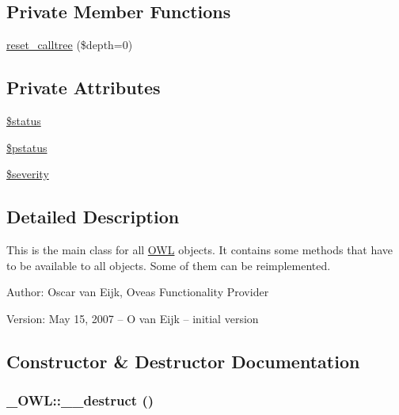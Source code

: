 \subsection*{Private Member Functions}
\begin{CompactItemize}
\item 
\hyperlink{class__OWL_91389e63fc76f6513147f302cbd92a2e}{reset\_\-calltree} (\$depth=0)
\end{CompactItemize}
\subsection*{Private Attributes}
\begin{CompactItemize}
\item 
\hyperlink{class__OWL_af448f6bc8a90e20c09e9e2b8fe46eb5}{\$status}
\item 
\hyperlink{class__OWL_f30c6ce2c59df6da2ef0f7059be9231e}{\$pstatus}
\item 
\hyperlink{class__OWL_d26b40a9dbbacb33e299b17826f8327c}{\$severity}
\end{CompactItemize}


\subsection{Detailed Description}
This is the main class for all \hyperlink{classOWL}{OWL} objects. It contains some methods that have to be available to all objects. Some of them can be reimplemented. \begin{Desc}
\item[Author:]Oscar van Eijk, Oveas Functionality Provider \end{Desc}
\begin{Desc}
\item[Version:]May 15, 2007 -- O van Eijk -- initial version \end{Desc}


\subsection{Constructor \& Destructor Documentation}
\hypertarget{class__OWL_44fd2222476a3109286cc82d92b6bbcc}{
\subsubsection{\setlength{\rightskip}{0pt plus 5cm}\_\-OWL::\_\-\_\-destruct ()}}
\label{class__OWL_44fd2222476a3109286cc82d92b6bbcc}


